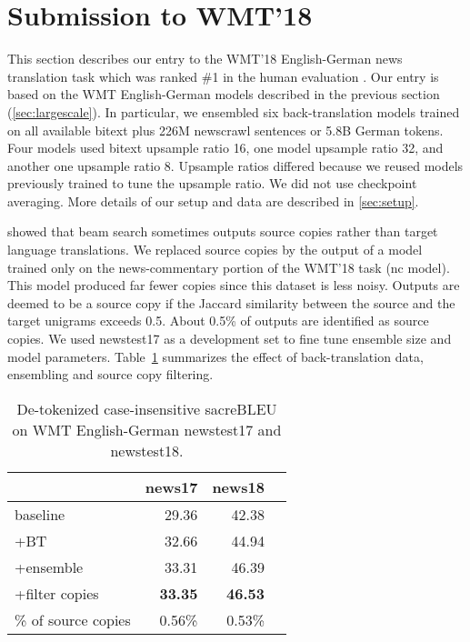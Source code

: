 \documentclass[11pt,a4paper]{article}
\begin{document}
\section{Submission to WMT'18}

This section describes our entry to the WMT'18 English-German news translation task which was ranked \#1 in the human evaluation \citep{bojar-EtAl:2018:WMT1}.
Our entry is based on the WMT English-German models described in the previous section (\textsection\ref{sec:largescale}).
In particular, we ensembled six back-translation models trained on all available bitext plus 226M newscrawl sentences or 5.8B German tokens.
Four models used bitext upsample ratio 16, one model upsample ratio 32, and another one upsample ratio 8.
Upsample ratios differed because we reused models previously trained to tune the upsample ratio. 
We did not use checkpoint averaging. 
More details of our setup and data are described in \textsection\ref{sec:setup}.

\citet{ott:uncertainty:2018} showed that beam search sometimes outputs source copies rather than target language translations. 
We replaced source copies by the output of a model trained only on the news-commentary portion of the WMT'18 task (nc model). 
This model produced far fewer copies since this dataset is less noisy.
Outputs are deemed to be a source copy if the Jaccard similarity between the source and the target unigrams exceeds 0.5.
About 0.5\% of outputs are identified as source copies.
We used newstest17 as a development set to fine tune ensemble size and model parameters. 
Table~\ref{tab:en2de_wmt18} summarizes the effect of back-translation data, ensembling and source copy filtering.

\begin{table}[t]
\centering
\begin{tabular}{lrrr}
\toprule
& \bf news17 & \bf news18 \\ \midrule
baseline    & 29.36 & 42.38 \\
+BT & 32.66  & 44.94 \\
+ensemble & 33.31 & 46.39 \\
+filter copies & {\bf 33.35} & {\bf 46.53} \\
\midrule
\% of source copies & 0.56\% & 0.53\% \\
\bottomrule
\end{tabular}
\caption{De-tokenized case-insensitive sacreBLEU on WMT English-German newstest17 and newstest18.}
\label{tab:en2de_wmt18}
\end{table}
\end{document}
